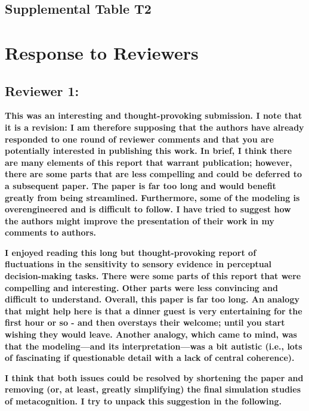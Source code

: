 \documentclass[
]{article}
\begin{document}
\newpage

\hypertarget{supplemental-table-t2}{%
\subsection{Supplemental Table T2}\label{supplemental-table-t2}}

\newpage

\hypertarget{response-to-reviewers}{%
\section{Response to Reviewers}\label{response-to-reviewers}}

\hypertarget{reviewer-1}{%
\subsection{Reviewer 1:}\label{reviewer-1}}

\textbf{This was an interesting and thought-provoking submission. I note
that it is a revision: I am therefore supposing that the authors have
already responded to one round of reviewer comments and that you are
potentially interested in publishing this work. In brief, I think there
are many elements of this report that warrant publication; however,
there are some parts that are less compelling and could be deferred to a
subsequent paper. The paper is far too long and would benefit greatly
from being streamlined. Furthermore, some of the modeling is
overengineered and is difficult to follow. I have tried to suggest how
the authors might improve the presentation of their work in my comments
to authors.}

\textbf{I enjoyed reading this long but thought-provoking report of
fluctuations in the sensitivity to sensory evidence in perceptual
decision-making tasks. There were some parts of this report that were
compelling and interesting. Other parts were less convincing and
difficult to understand. Overall, this paper is far too long. An analogy
that might help here is that a dinner guest is very entertaining for the
first hour or so - and then overstays their welcome; until you start
wishing they would leave. Another analogy, which came to mind, was that
the modeling---and its interpretation---was a bit autistic (i.e., lots
of fascinating if questionable detail with a lack of central
coherence).}

\textbf{I think that both issues could be resolved by shortening the
paper and removing (or, at least, greatly simplifying) the final
simulation studies of metacognition. I try to unpack this suggestion in
the following.}
\end{document}
